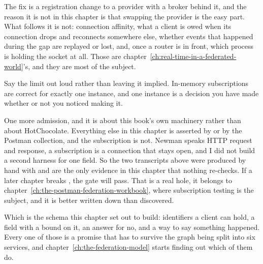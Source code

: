 The fix is a registration change to a provider with a broker behind it, and the
reason it is not in this chapter is that swapping the provider is the easy part.
What follows it is not: connection affinity, what a client is owed when its
connection drops and reconnects somewhere else, whether events that happened
during the gap are replayed or lost, and, once a router is in front, which
process is holding the socket at all. Those are
chapter~\ref{ch:real-time-in-a-federated-world}'s, and they are most of the
subject.

Say the limit out loud rather than leaving it implied. In-memory subscriptions
are correct for exactly one instance, and one instance is a decision you have
made whether or not you noticed making it.

%
One more admission, and it is about this book's own machinery rather than about
HotChocolate. Everything else in this chapter is asserted by
 or by the Postman collection, and the subscription is
not. Newman speaks HTTP request and response, a subscription is a connection
that stays open, and I did not build a second harness for one field. So the two
transcripts above were produced by hand with  and are the only
evidence in this chapter that nothing re-checks. If a later chapter breaks
, the gate will pass. That is a real hole, it belongs to
chapter~\ref{ch:the-postman-federation-workbook}, where subscription testing is
the subject, and it is better written down than discovered.

Which is the schema this chapter set out to build: identifiers a client can
hold, a field with a bound on it, an answer for no, and a way to say something
happened. Every one of those is a promise that has to survive the graph being
split into six services, and chapter~\ref{ch:the-federation-model} starts
finding out which of them do.
